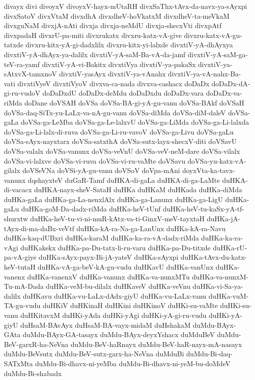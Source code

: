 {divayx
divi
divoyxV
divoyxV-hayx-mUtaRH
divxSaThx-tAvx-da-navx-ya-sAyxpi
divxSatoV
divxVtaM
divxdhA
divxdheV-hoVkatxM
divxdheV-ta-meVkaM
divxguNaM
divxjA-nAti
divxja
divxja-neMdU
divxja-shecxVti
divxpAtf
divxpadaH
divxrU-pa-miti
divxrukatx
divxru-katx-vA-give
divxru-katx-vA-gu-tatxde
divxru-kitx-yA-gi-dadxlilx
divxru-kitx-yi-lalxde
divxtiV-yA-dhAyxya
divxtiV-yA-dhAyx-ya-dalilx
divxtiV-yA-saM-Ba-vA-da-jamf
divxtiV-yA-saM-ga-teV-ra-yamf
divxtiV-yA-vi-Bakitx
divxtiVya
divxtiV-ya-pakaSx
divxtiV-ya-sAtxvX-tamxnoV
divxtiV-yasAyx
divxtiV-ya-vAnahx
divxtiV-ya-vA-nahx-Ba-vati
divxtiVyeV
divxtiVyoV
divxva-ca-nada
divxva-cashacx
doDaDx
doDaDx-dA-gi-ru-vudoV
doDaDxdU
doDaDx-deMdu
doDaDxdu
doDaDx-vara
doDaDx-va-riMda
doDane
doVSAH
doVSa
doVSa-BA-gi-yA-gu-vanu
doVSa-BAkf
doVSaH
doVSa-daq-SiTx-yu-LaLx-va-nA-gu-vanu
doVSa-diMda
doVSa-diM-daleV
doVSa-gaLa
doVSa-ga-LeMba
doVSa-ga-Le-lalxvU
doVSa-ga-LiMda
doVSa-ga-Li-lalxda
doVSa-ga-Li-lalx-di-ruva
doVSa-ga-Li-ru-vavoV
doVSa-ga-Livu
doVSa-gaLu
doVSa-sAyx-nayxtarx
doVSa-satxthA
doVSa-sutx-layx-shecxV-diti
doVSavU
doVSa-valalx
doVSa-vanunx
doVSa-veVnU
doVSa-veV-neM-dare
doVSa-vilalx
doVSa-vi-lalxve
doVSa-vi-ruva
doVSa-vi-ru-vaMte
doVSavu
doVSa-yu-katx-vA-gilalx
doVSeVNa
doVSi-yA-gu-vanu
doVSoV
doVpa-mAni
doyxVta-ka-tavx-vanunx
dqshayxteV
duGaR-Tamf
duHKA-di-gaLa
duHKA-di-ga-LaMte
duHKA-di-vacacx
duHKA-nayx-sheV-SataH
duHKa
duHKaM
duHKada
duHKa-diMda
duHKa-gaLa
duHKa-ga-La-nenxlAlx
duHKa-ga-Lanunx
duHKa-ga-LigU
duHKa-gaLu
duHKa-goM-Da-dadx-riMda
duHKa-heV-tUnf
duHKa-heV-tu-kaSx-yA-tf-shurxtw
duHKa-heV-tu-vi-ni-muR-kAtx-va-ti-GinxV-meV-tayxtaH
duHKa-jA-tAyx-di-ma-daBx-veVtf
duHKa-kA-ra-Na-ga-LanUnx
duHKa-kA-ra-Navu
duHKa-kaq-dUBxri
duHKa-karaM
duHKa-ka-ra-vA-dadx-riMda
duHKa-ka-ra-vAgi
duHKakekx
duHKa-pa-Du-tatx-li-ru-varu
duHKa-pa-Du-titxde
duHKa-rU-pa-vA-giye
duHKa-sAyx-payx-Bi-jA-yateV
duHKa-sAyxpi
duHKa-tAvx-du-katx-heV-tutaH
duHKa-vA-ga-beV-kA-gu-vudu
duHKavU
duHKa-vanUnx
duHKa-vanenx
duHKa-vanenxV
duHKa-vanunx
duHKa-va-nunxMTu
duHKa-va-nunxM-Tu-mA-Dada
duHKa-veM-bu-dilalx
duHKaveV
duHKa-veVnu
duHKa-vi-Sa-ya-dalilx
duHKavu
duHKa-vu-LaLx-dAdx-giyU
duHKa-vu-LaLx-vanu
duHKa-vuM-TA-gu-vudu
duHKiV
duHKinaH
duHKini
duHKinoV
duHKi-su-vaMte
duHKi-su-vanu
duHKitavxM
duHKi-yAda
duHKi-yAgi
duHKi-yA-gi-ru-vudu
duHKi-yA-giyU
duHsaM-BAvAyx
duHsaM-BA-vayx-midaM
duHshakaM
duMdu-BAyx-GAta
duMdu-BAyx-GA-tasayx
duMdu-BAyx-deyxYshacx
duMduBeV
duMdu-BeV-garxR-ha-NeVna
duMdu-BeV-haRnayx
duMdu-BeV-haR-nayx-mA-nasayx
duMdu-BeVsutx
duMdu-BeV-sutx-garx-ha-NeVna
duMduBi
duMdu-Bi-daq-SATxMta
duMdu-Bi-dhavx-ni-yeMba
duMdu-Bi-dhavx-ni-yeM-bu-doMdeV
duMdu-Bi-shabadx
}
